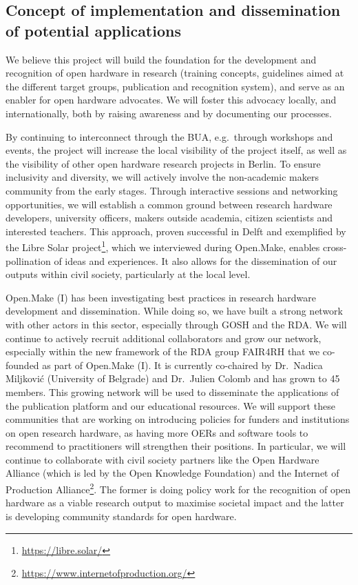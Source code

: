 \documentclass[
  12pt,
  a4paper,
]{article}
\begin{document}
\hypertarget{concept-of-implementation-and-dissemination-of-potential-applications}{%
\subsection{Concept of implementation and dissemination of potential
applications}\label{concept-of-implementation-and-dissemination-of-potential-applications}}

We believe this project will build the foundation for the development
and recognition of open hardware in research (training concepts,
guidelines aimed at the different target groups, publication and
recognition system), and serve as an enabler for open hardware
advocates. We will foster this advocacy locally, and internationally,
both by raising awareness and by documenting our processes.

By continuing to interconnect through the BUA, e.g.~through workshops
and events, the project will increase the local visibility of the
project itself, as well as the visibility of other open hardware
research projects in Berlin. To ensure inclusivity and diversity, we
will actively involve the non-academic makers community from the early
stages. Through interactive sessions and networking opportunities, we
will establish a common ground between research hardware developers,
university officers, makers outside academia, citizen scientists and
interested teachers. This approach, proven successful in Delft and
exemplified by the Libre Solar project\footnote{\url{https://libre.solar/}},
which we interviewed during Open.Make, enables cross-pollination of
ideas and experiences. It also allows for the dissemination of our
outputs within civil society, particularly at the local level.

Open.Make (I) has been investigating best practices in research hardware
development and dissemination. While doing so, we have built a strong
network with other actors in this sector, especially through GOSH and
the RDA. We will continue to actively recruit additional collaborators
and grow our network, especially within the new framework of the RDA
group FAIR4RH that we co-founded as part of Open.Make (I). It is
currently co-chaired by Dr.~Nadica Miljković (University of Belgrade)
and Dr.~Julien Colomb and has grown to 45 members. This growing network
will be used to disseminate the applications of the publication platform
and our educational resources. We will support these communities that
are working on introducing policies for funders and institutions on open
research hardware, as having more OERs and software tools to recommend
to practitioners will strengthen their positions. In particular, we will
continue to collaborate with civil society partners like the Open
Hardware Alliance (which is led by the Open Knowledge Foundation) and
the Internet of Production Alliance\footnote{\url{https://www.internetofproduction.org/}}.
The former is doing policy work for the recognition of open hardware as
a viable research output to maximise societal impact and the latter is
developing community standards for open hardware.
\end{document}
